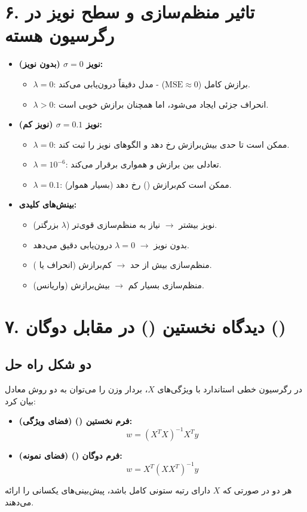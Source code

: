 \documentclass{article}
\begin{document}
\section*{۶. تاثیر منظم‌سازی و سطح نویز در رگرسیون هسته}
\begin{itemize}
    \item \textbf{نویز $\sigma = 0$ (بدون نویز):}
    \begin{itemize}
        \item $\lambda = 0$: برازش کامل ($\text{MSE} \approx 0$) - مدل دقیقاً درون‌یابی می‌کند.
        \item $\lambda > 0$: انحراف جزئی ایجاد می‌شود، اما همچنان برازش خوبی است.
    \end{itemize}
    \item \textbf{نویز $\sigma = 0.1$ (نویز کم):}
    \begin{itemize}
        \item $\lambda = 0$: ممکن است تا حدی بیش‌برازش رخ دهد و الگوهای نویز را ثبت کند.
        \item $\lambda = 10^{-6}$: تعادلی بین برازش و همواری برقرار می‌کند.
        \item $\lambda = 0.1$: ممکن است کم‌برازش () رخ دهد (بسیار هموار).
    \end{itemize}
    \item \textbf{بینش‌های کلیدی:}
    \begin{itemize}
        \item نویز بیشتر $\to$ نیاز به منظم‌سازی قوی‌تر ($\lambda$ بزرگتر).
        \item بدون نویز $\to$ $\lambda=0$ درون‌یابی دقیق می‌دهد.
        \item منظم‌سازی بیش از حد $\to$ کم‌برازش (انحراف یا ).
        \item منظم‌سازی بسیار کم $\to$ بیش‌برازش (واریانس).
    \end{itemize}
\end{itemize}

\section*{۷. دیدگاه نخستین () در مقابل دوگان ()}

\subsection*{دو شکل راه حل}
در رگرسیون خطی استاندارد با ویژگی‌های $X$، بردار وزن را می‌توان به دو روش معادل بیان کرد:
\begin{itemize}
    \item \textbf{فرم نخستین () (فضای ویژگی):}
    \[
    w = (X^T X)^{-1} X^T y
    \]
    \item \textbf{فرم دوگان () (فضای نمونه):}
    \[
    w = X^T (X X^T)^{-1} y
    \]
\end{itemize}
هر دو در صورتی که $X$ دارای رتبه ستونی کامل باشد، پیش‌بینی‌های یکسانی را ارائه می‌دهند.
\end{document}
